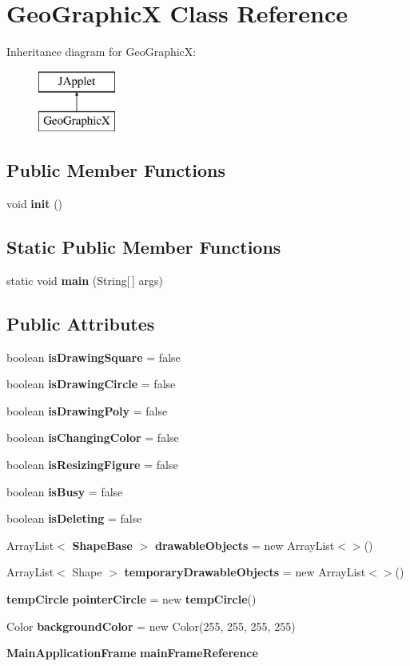 \section{Geo\+GraphicX Class Reference}
\label{class_geo_graphic_x}
Inheritance diagram for Geo\+GraphicX\+:\begin{figure}[H]
\begin{center}
\leavevmode
\includegraphics[height=2.000000cm]{class_geo_graphic_x}
\end{center}
\end{figure}
\subsection*{Public Member Functions}
\begin{DoxyCompactItemize}
\item 
void \textbf{ init} ()
\end{DoxyCompactItemize}
\subsection*{Static Public Member Functions}
\begin{DoxyCompactItemize}
\item 
static void \textbf{ main} (String[$\,$] args)
\end{DoxyCompactItemize}
\subsection*{Public Attributes}
\begin{DoxyCompactItemize}
\item 
boolean \textbf{ is\+Drawing\+Square} = false
\item 
boolean \textbf{ is\+Drawing\+Circle} = false
\item 
boolean \textbf{ is\+Drawing\+Poly} = false
\item 
boolean \textbf{ is\+Changing\+Color} = false
\item 
boolean \textbf{ is\+Resizing\+Figure} = false
\item 
boolean \textbf{ is\+Busy} = false
\item 
boolean \textbf{ is\+Deleting} = false
\item 
Array\+List$<$ \textbf{ Shape\+Base} $>$ \textbf{ drawable\+Objects} = new Array\+List$<$$>$()
\item 
Array\+List$<$ Shape $>$ \textbf{ temporary\+Drawable\+Objects} = new Array\+List$<$$>$()
\item 
\textbf{ temp\+Circle} \textbf{ pointer\+Circle} = new \textbf{ temp\+Circle}()
\item 
Color \textbf{ background\+Color} = new Color(255, 255, 255, 255)
\item 
\textbf{ Main\+Application\+Frame} \textbf{ main\+Frame\+Reference}
\end{DoxyCompactItemize}


